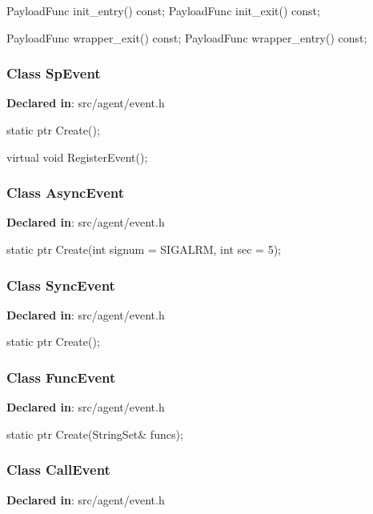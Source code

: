 \begin{apient}
PayloadFunc init_entry() const;
PayloadFunc init_exit() const;
\end{apient}
\apidesc{
}

\begin{apient}
PayloadFunc wrapper_exit() const;
PayloadFunc wrapper_entry() const;
\end{apient}
\apidesc{
}

\subsubsection{Class SpEvent}
\textbf{Declared in}: src/agent/event.h

\begin{apient}
static ptr Create();
\end{apient}
\apidesc{
}

\begin{apient}
virtual void RegisterEvent();
\end{apient}
\apidesc{
}

\subsubsection{Class AsyncEvent}
\textbf{Declared in}: src/agent/event.h

\begin{apient}
static ptr Create(int signum = SIGALRM,
                  int sec = 5);
\end{apient}
\apidesc{
}

\subsubsection{Class SyncEvent}
\textbf{Declared in}: src/agent/event.h

\begin{apient}
static ptr Create();
\end{apient}
\apidesc{
}

\subsubsection{Class FuncEvent}
\textbf{Declared in}: src/agent/event.h

\begin{apient}
static ptr Create(StringSet& funcs);
\end{apient}
\apidesc{
}

\subsubsection{Class CallEvent}
\textbf{Declared in}: src/agent/event.h

